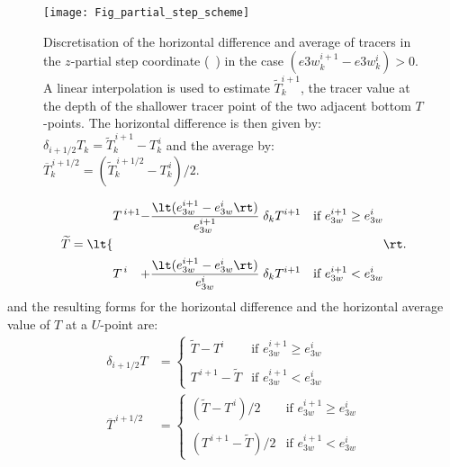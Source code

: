 \documentclass[../main/NEMO_manual]{subfiles}
\begin{document}
\begin{figure}[!p]
  \begin{center}
    \texttt{[image: Fig\_partial\_step\_scheme]}
    \caption{
      \protect\label{fig:Partial_step_scheme}
      Discretisation of the horizontal difference and average of tracers in the $z$-partial step coordinate
      (\protect{}~) in the case $(e3w_k^{i + 1} - e3w_k^i) > 0$.
      A linear interpolation is used to estimate $\widetilde T_k^{i + 1}$,
      the tracer value at the depth of the shallower tracer point of the two adjacent bottom $T$-points.
      The horizontal difference is then given by: $\delta_{i + 1/2} T_k = \widetilde T_k^{\, i + 1} -T_k^{\, i}$ and
      the average by: $\overline T_k^{\, i + 1/2} = (\widetilde T_k^{\, i + 1/2} - T_k^{\, i}) / 2$.
    }
  \end{center}
\end{figure}
\[
  \widetilde T = \lt\{
    \begin{alignedat}{2}
      &T^{\, i + 1} &-\frac{ \lt( e_{3w}^{i + 1} -e_{3w}^i \rt) }{ e_{3w}^{i + 1} } \; \delta_k T^{i + 1}
      & \quad \text{if $e_{3w}^{i + 1} \geq e_{3w}^i$} \\ \\
      &T^{\, i}     &+\frac{ \lt( e_{3w}^{i + 1} -e_{3w}^i \rt )}{e_{3w}^i       } \; \delta_k T^{i + 1}
      & \quad \text{if $e_{3w}^{i + 1} <    e_{3w}^i$}
    \end{alignedat}
  \rt.
\]
and the resulting forms for the horizontal difference and the horizontal average value of $T$ at a $U$-point are: 
\begin{equation}
  \label{eq:zps_hde}
  \begin{split}
    \delta_{i + 1/2} T       &=
    \begin{cases}
                                \widetilde T - T^i          & \text{if~} e_{3w}^{i + 1} \geq e_{3w}^i \\
                                \\
                                T^{\, i + 1} - \widetilde T & \text{if~} e_{3w}^{i + 1} <    e_{3w}^i
    \end{cases}
    \\
    \overline T^{\, i + 1/2} &=
    \begin{cases}
                                (\widetilde T - T^{\, i}   ) / 2 & \text{if~} e_{3w}^{i + 1} \geq e_{3w}^i \\
                                \\
                                (T^{\, i + 1} - \widetilde T) / 2 & \text{if~} e_{3w}^{i + 1} <   e_{3w}^i
    \end{cases}
  \end{split}
\end{equation}
\end{document}
